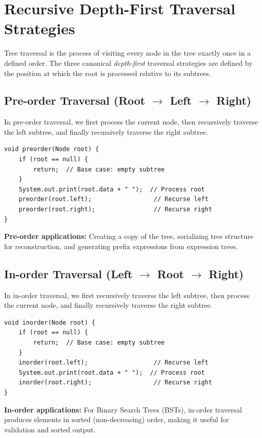 \documentclass[10pt,journal,compsoc,onecolumn]{IEEEtran}
\begin{document}
\section{Recursive Depth-First Traversal Strategies}
\label{sec:recursive_traversals}

Tree traversal is the process of visiting every node in the tree exactly once in a defined order. The three canonical \emph{depth-first} traversal strategies are defined by the position at which the root is processed relative to its subtrees.

\subsection{Pre-order Traversal (Root $\to$ Left $\to$ Right)}

In pre-order traversal, we first process the current node, then recursively traverse the left subtree, and finally recursively traverse the right subtree.

\begin{verbatim}
void preorder(Node root) {
    if (root == null) {
        return;  // Base case: empty subtree
    }
    System.out.print(root.data + " ");  // Process root
    preorder(root.left);                 // Recurse left
    preorder(root.right);                // Recurse right
}
\end{verbatim}

\textbf{Pre-order applications:} Creating a copy of the tree, serializing tree structure for reconstruction, and generating prefix expressions from expression trees.

\subsection{In-order Traversal (Left $\to$ Root $\to$ Right)}

In in-order traversal, we first recursively traverse the left subtree, then process the current node, and finally recursively traverse the right subtree.

\begin{verbatim}
void inorder(Node root) {
    if (root == null) {
        return;  // Base case: empty subtree
    }
    inorder(root.left);                  // Recurse left
    System.out.print(root.data + " ");  // Process root
    inorder(root.right);                 // Recurse right
}
\end{verbatim}

\textbf{In-order applications:} For Binary Search Trees (BSTs), in-order traversal produces elements in sorted (non-decreasing) order, making it useful for validation and sorted output.
\end{document}
